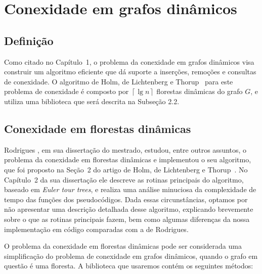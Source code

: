 

\chapter{Conexidade em grafos dinâmicos}

\enlargethispage{.8\baselineskip}

\section{Definição}

Como citado no Capítulo~1, o problema da conexidade em grafos dinâmicos visa construir um algoritmo eficiente que dá suporte a inserções, remoções e consultas de conexidade. O algoritmo de Holm, de Lichtenberg e Thorup~\cite{jacob_holm} para este problema de conexidade é composto por $\left\lceil \lg n \right\rceil$ florestas dinâmicas do grafo $G$, e utiliza uma biblioteca que será descrita na Subseção 2.2. 

\section{Conexidade em florestas dinâmicas}

Rodrigues \cite{arthur}, em sua dissertação do mestrado, estudou, entre outros assuntos, o problema da conexidade em florestas dinâmicas e implementou o seu algoritmo, que foi proposto na Seção~2 do artigo de Holm, de Lichtenberg e Thorup~\cite{jacob_holm}. No Capítulo~2 da sua dissertação ele descreve as rotinas principais do algoritmo, baseado em \textit{Euler tour trees}, e realiza uma análise minuciosa da complexidade de tempo das funções dos pseudocódigos. Dada essas circunstâncias, optamos por não apresentar uma descrição detalhada desse algoritmo, explicando brevemente sobre o que as rotinas principais fazem, bem como algumas diferenças da nossa implementação em código comparadas com a de Rodrigues.  

O problema da conexidade em florestas dinâmicas pode ser considerada uma simplificação do problema de conexidade em grafos dinâmicos, quando o grafo em questão é uma floresta. A biblioteca que usaremos contém os seguintes métodos:

